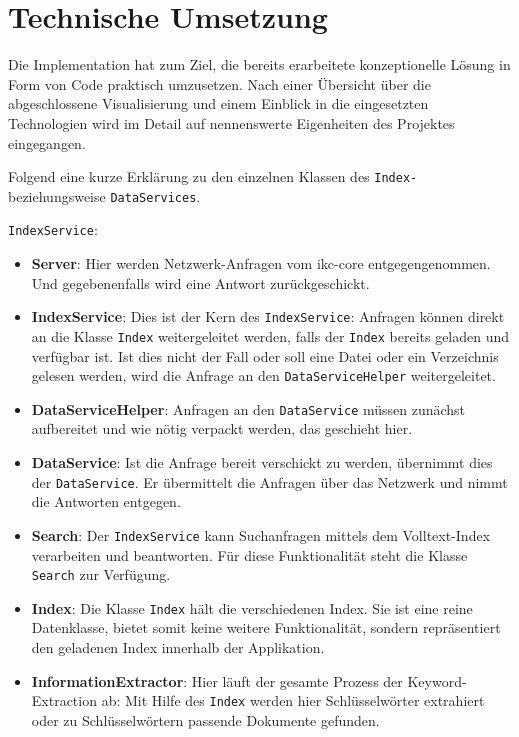 \chapter{Technische Umsetzung} \label{implementation}

Die Implementation hat zum Ziel, die bereits erarbeitete konzeptionelle Lösung in Form von Code praktisch umzusetzen. Nach einer Übersicht über die abgeschlossene Visualisierung und einem Einblick in die eingesetzten Technologien wird im Detail auf nennenswerte Eigenheiten des Projektes eingegangen.


Folgend eine kurze Erklärung zu den einzelnen Klassen des \texttt{Index-} beziehungsweise \texttt{DataServices}.

\texttt{IndexService}:
\begin{itemize}
    \item \textbf{Server}: Hier werden Netzwerk-Anfragen vom \gls{ikc-core} entgegengenommen. Und gegebenenfalls wird eine Antwort zu\-rück\-ge\-schi\-ckt.
    \item \textbf{IndexService}: Dies ist der Kern des \texttt{IndexService}: Anfragen können direkt an die Klasse \texttt{Index} weitergeleitet werden, falls der \texttt{Index} bereits geladen und verfügbar ist. Ist dies nicht der Fall oder soll eine Datei oder ein Verzeichnis gelesen werden, wird die Anfrage an den \texttt{DataServiceHelper} weitergeleitet.
    \item \textbf{DataServiceHelper}: Anfragen an den \texttt{DataService} müssen zu\-nä\-chst aufbereitet und wie nötig verpackt werden, das geschieht hier.
    \item \textbf{DataService}: Ist die Anfrage bereit verschickt zu werden, üb\-er\-ni\-mmt dies der \texttt{DataService}. Er übermittelt die Anfragen über das Netzwerk und nimmt die Antworten entgegen.
    \item \textbf{Search}: Der \texttt{IndexService} kann Suchanfragen mittels dem Voll\-te\-xt-Index verarbeiten und beantworten. Für diese Funktionalität steht die Klasse \texttt{Search} zur Verfügung.
    \item \textbf{Index}: Die Klasse \texttt{Index} hält die verschiedenen Index. Sie ist eine reine Datenklasse, bietet somit keine weitere Funktionalität, sondern repräsentiert den geladenen Index innerhalb der Applikation.
    \item \textbf{InformationExtractor}: Hier läuft der gesamte Prozess der Key\-wo\-rd-\-Ex\-trac\-ti\-on ab: Mit Hilfe des \texttt{Index} werden hier Schlüs\-sel\-wör\-ter extrahiert oder zu Schlü\-ssel\-wör\-tern passende Dokumente gefunden.
\end{itemize}


